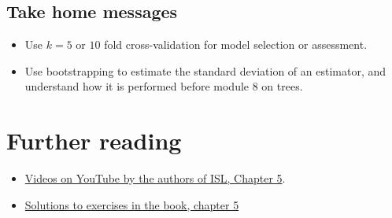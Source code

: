 \documentclass[]{article}
\providecommand{\tightlist}{%
  \setlength{\itemsep}{0pt}\setlength{\parskip}{0pt}}
\begin{document}
\hypertarget{take-home-messages}{%
\subsection{Take home messages}\label{take-home-messages}}

\begin{itemize}
\tightlist
\item
  Use \(k=5\) or \(10\) fold cross-validation for model selection or
  assessment.
\item
  Use bootstrapping to estimate the standard deviation of an estimator,
  and understand how it is performed before module 8 on trees.
\end{itemize}

\hypertarget{further-reading}{%
\section{Further reading}\label{further-reading}}

\begin{itemize}
\tightlist
\item
  \href{https://www.youtube.com/playlist?list=PL5-da3qGB5IA6E6ZNXu7dp89_uv8yocmf}{Videos
  on YouTube by the authors of ISL, Chapter 5}.
\item
  \href{https://rstudio-pubs-static.s3.amazonaws.com/65561_43c0eaaa8565414eae333b47038f716c.html}{Solutions
  to exercises in the book, chapter 5}
\end{itemize}
\end{document}
